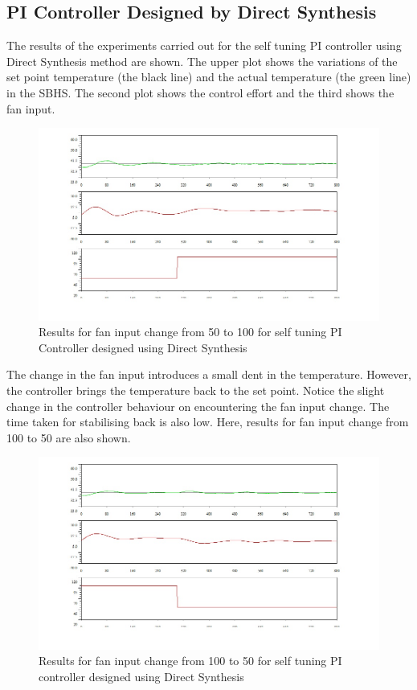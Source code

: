 \subsection{PI Controller Designed by Direct Synthesis}
The results of the experiments carried out for the self tuning PI controller using Direct Synthesis method are shown. 
The upper plot shows the variations of the set point temperature (the black line) and the actual temperature (the green line)
in the SBHS. The second plot shows the control effort and the third shows the fan input.

\begin{figure}[h]
	\centering
\includegraphics[width=0.7\linewidth]{Vikas_self/report_tex/PID_results/self_tuning/FanDisturbance/DirectSynthesis/step50to100.jpg}
	\caption{Results for fan input change from 50 to 100 for self tuning PI Controller designed using Direct Synthesis}
\end{figure}
The change in the fan input introduces a small dent in the temperature. However, the controller brings the temperature 
back to the set point. Notice the slight change in the controller behaviour on encountering the fan input change. The 
time taken for stabilising back is also low.
\newpage
Here, results for fan input change from 100 to 50 are also shown.
\begin{figure}[h]
	\centering
\includegraphics[width=0.7\linewidth]{Vikas_self/report_tex/PID_results/self_tuning/FanDisturbance/DirectSynthesis/step100to50.jpg}
	\caption{Results for fan input change from 100 to 50 for self tuning PI controller designed using Direct Synthesis}
\end{figure}

